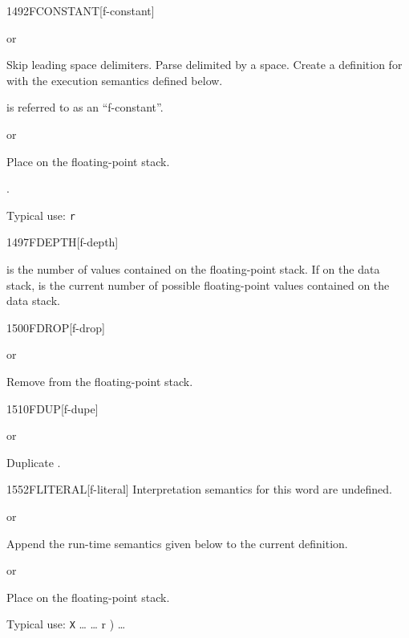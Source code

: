 \begin{worddef}{1492}{FCONSTANT}[f-constant]
\item {}  or

	Skip leading space delimiters. Parse  delimited by a
	space. Create a definition for  with the execution
	semantics defined below.

	 is referred to as an ``f-constant''.

\execute[name]
	\stack{}{}  or

	Place  on the floating-point stack.

\see {}.

	\begin{rationale} %
		Typical use: \texttt{r}  
	\end{rationale}
\end{worddef}


\begin{worddef}{1497}{FDEPTH}[f-depth]
\item {}

	 is the number of values contained on the
	 floating-point stack. If
	 on the data stack,  is the
	current number of possible floating-point values contained on
	the data stack.
\end{worddef}


\begin{worddef}{1500}{FDROP}[f-drop]
\item {} or

	Remove  from the floating-point stack.
\end{worddef}


\begin{worddef}{1510}{FDUP}[f-dupe]
\item {} or

	Duplicate .
\end{worddef}


\begin{worddef}{1552}{FLITERAL}[f-literal]
\interpret
	Interpretation semantics for this word are undefined.

\compile
	 or

	Append the run-time semantics given below to the current
	definition.

\runtime
	 or

	Place  on the floating-point stack.

	\begin{rationale} %
		Typical use:
			\word[core]{:} \texttt{X} {\ldots}
				\word[core]{[} {\ldots}  r ) \word[core]{]}
				 {\ldots}
			\word[core]{;}
	\end{rationale}
\end{worddef}


